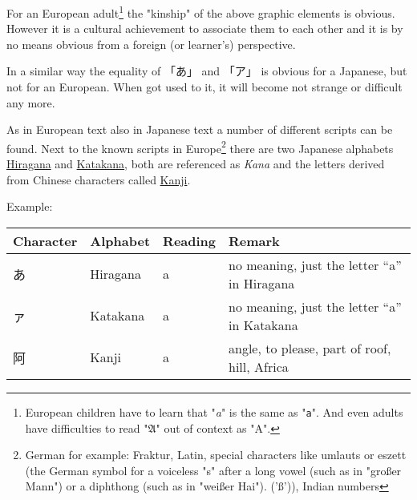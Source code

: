 For an European adult\footnote{European children have to learn that
"\textit{a}" is the same as "\texttt{a}". And even adults have difficulties to
read "$\mathfrak{A}$" out of context as "A".}  the "kinship" of the above
graphic elements is obvious. However it is a cultural achievement to associate
them to each other and it is by no means obvious from a foreign (or learner's)
perspective. 

In a similar way the equality of {「あ」} and {「ア」} is obvious for a
Japanese, but not for an European. When got used to it, it will become not
strange or difficult any more.

As in European text also in Japanese text a number of different scripts can be
found. Next to the known scripts in Europe\footnote{German for example:
Fraktur, Latin, special characters like umlauts or eszett (the German
symbol for a voiceless "s" after a long vowel (such as in "großer Mann") or a
diphthong (such as in "weißer Hai"). ('ß')), Indian numbers} there are two
Japanese alphabets
 \hyperref[sec:Hiragana]{Hiragana} and
\hyperref[sec:Katakana]{Katakana}, both are referenced as \textit{Kana} and
the letters derived from Chinese characters called \hyperref[sec:Kanji]{Kanji}.

Example:

\begin{center}
\begin{tabular}{|l|l|l|l|}
\textbf{Character}&\textbf{Alphabet}&\textbf{Reading}&\textbf{Remark}\\\hline
あ& Hiragana & a & no meaning, just the letter  ``a'' in Hiragana \\
ァ& Katakana & a & no meaning, just the letter ``a'' in Katakana \\
阿& Kanji    & a & { angle, to please, part of roof, hill, Africa}\\
\end{tabular}
\end{center}

